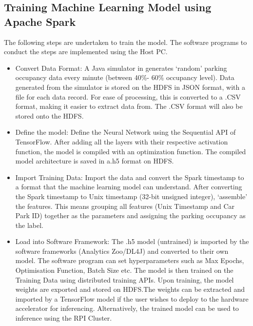 \subsection{Training Machine Learning Model using Apache Spark}
The following steps are undertaken to train the model. The software programs to conduct the steps are implemented using the Host PC.

\begin{itemize}
    \item Convert Data Format: A Java simulator in generates ‘random’ parking occupancy data every minute (between 40\%-
    60\% occupancy level). Data generated from the simulator is stored on the HDFS in JSON format, with a file for each
    data record. For ease of processing, this is converted to a .CSV format, making it easier to extract data from. The .CSV format will also be stored onto the HDFS.  
    
    \item Define the model: Define the Neural Network using the Sequential API of TensorFlow. After adding all the layers with
    their respective activation function, the model is compiled with an optimization function. The compiled model
    architecture is saved in a.h5 format on HDFS. 
    
    \item Import Training Data: Import the data and convert the Spark timestamp to a format that the machine learning model
    can understand. After converting the Spark timestamp to Unix timestamp (32-bit unsigned integer), ‘assemble’ the
    features. This means grouping all features (Unix Timestamp and Car Park ID) together as the parameters and assigning
    the parking occupancy as the label. 
    
    \item Load into Software Framework: The .h5 model (untrained) is imported by the software frameworks (Analytics Zoo/DL4J) and converted to their own model. The software program can set hyperparameters such as Max Epochs, Optimisation Function, Batch Size etc. The model is then trained on the Training Data using distributed training APIs. Upon training, the model weights are exported and stored on HDFS.The weights can be extracted and imported by a TensorFlow model if the user wishes to deploy to the hardware accelerator for inferencing. Alternatively, the trained model can be used to inference using the RPI Cluster.
    
   
\end{itemize}










